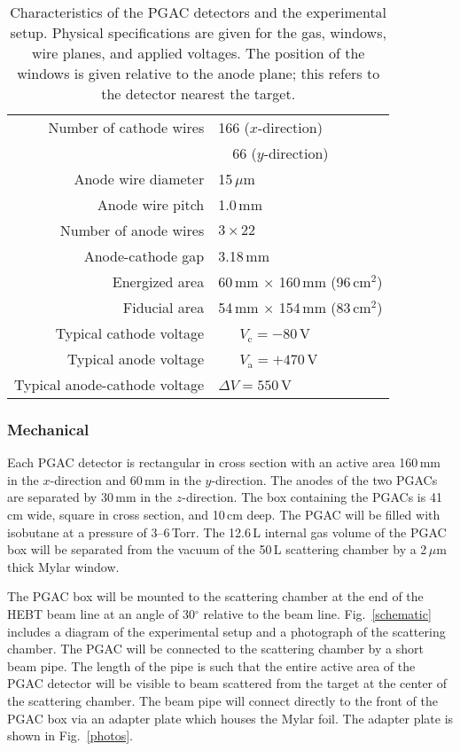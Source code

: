 \begin{table}[t]
\begin{center}
\begin{tabulary}{1.0\textwidth}{R|L}
\raggedleft Number of cathode wires&166 ($x$-direction)\\
& ~~66 ($y$-direction)\\
\raggedleft Anode wire diameter&15\,$\mu$m\\
\raggedleft Anode wire pitch&1.0\,mm\\
\raggedleft Number of anode wires &$3\times22$\\  
\raggedleft Anode-cathode gap&3.18\,mm\\
\raggedleft Energized area&60\,mm $\times$ 160\,mm (96\,cm$^2$)\\
\raggedleft Fiducial area&54\,mm $\times$ 154\,mm (83\,cm$^2$)\\
\hline %
\raggedleft Typical cathode voltage & ~~~$V_\textrm{c}=-80$\,V\\
\raggedleft Typical anode voltage & ~~~$V_\textrm{a}=+470$\,V\\
\raggedleft Typical anode-cathode voltage &$\Delta V=550$\,V\\
\end{tabulary}
\end{center}
\caption{Characteristics of the PGAC detectors and the experimental setup. Physical specifications are given for the gas, windows, wire planes, and applied voltages. The position of the windows is given relative to the anode plane; this refers to the detector nearest the target.}
\label{detector}
\end{table}

\subsubsection{Mechanical}
Each PGAC detector is rectangular in cross section with an active area 160\,mm in the $x$-direction and 60\,mm in the $y$-direction. The anodes of the two PGACs are separated by 30\,mm in the $z$-direction. The box containing the PGACs is 41\,cm wide, square in cross section, and 10\,cm deep.
The PGAC will be filled with isobutane at a pressure of 3--6\,Torr. The 12.6\,L internal gas volume of the PGAC box will be separated from the vacuum of the 50\,L scattering chamber by a 2\,$\mu$m thick Mylar window. 

The PGAC box will be mounted to the scattering chamber at the end of the HEBT beam line at an angle of 30$^\circ$ relative to the beam line.  Fig.~\ref{schematic} includes a diagram of the experimental setup and a photograph of the scattering chamber.  The PGAC will be connected to the scattering chamber by a short beam pipe.  The length of the pipe is such that the 
entire active area of the PGAC detector will be visible to beam scattered from the target
 at the center of the scattering chamber. The beam pipe will connect directly to the front of the PGAC box via an adapter plate which houses the Mylar foil. The adapter plate is shown in Fig.~\ref{photos}.

